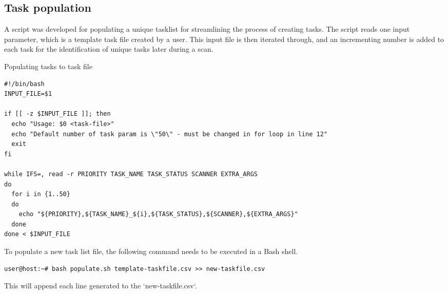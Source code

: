 \subsection{Task population}
\label{s:TaskPopulation}
A script was developed for populating a unique tasklist for streamlining the process of creating tasks.
The script reads one input parameter, which is a template task file created by a user.
This input file is then iterated through, and an incrementing number is added to each task for the identification of unique tasks later during a scan.
\begin{listing}[!ht]
\caption{Populating tasks to task file}
\label{lst:TaskPopulation}
\begin{verbatim}
#!/bin/bash
INPUT_FILE=$1

if [[ -z $INPUT_FILE ]]; then
  echo "Usage: $0 <task-file>"
  echo "Default number of task param is \"50\" - must be changed in for loop in line 12"
  exit
fi

while IFS=, read -r PRIORITY TASK_NAME TASK_STATUS SCANNER EXTRA_ARGS
do
  for i in {1..50}
  do
    echo "${PRIORITY},${TASK_NAME}_${i},${TASK_STATUS},${SCANNER},${EXTRA_ARGS}"
  done
done < $INPUT_FILE
\end{verbatim}
\end{listing}

To populate a new task list file, the following command needs to be executed in a Bash shell.
\begin{verbatim}
user@host:~# bash populate.sh template-taskfile.csv >> new-taskfile.csv
\end{verbatim}
This will append each line generated to the `new-taskfile.csv`.